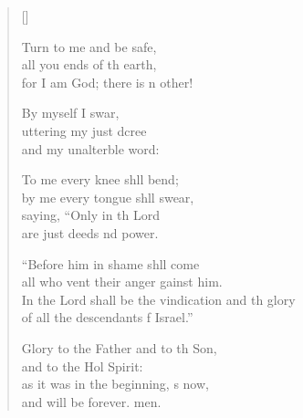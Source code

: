 \begin{verse}[\versewidth]
\begin{patverse}
Turn to me and be safe,\Flex\\
all you ends of th earth,\Med\\
for I am God; there is n other!

By myself I swar,\Flex\\
uttering my just dcree\Med\\
and my unalterble word:

To me every knee shll bend;\Med\\
by me every tongue shll swear,\\
saying, “Only in th Lord\Med\\
are just deeds nd power.

“Before him in shame shll come\Med\\
all who vent their anger gainst him.\\
In the Lord shall be the vindication and th glory\Med\\
of all the descendants f Israel.”

Glory to the Father and to th Son,\Med\\
and to the Hol Spirit:\\
as it was in the beginning, \pointup{\i}s now,\Med\\
and will be forever. men.
  \end{patverse}
\end{verse}
